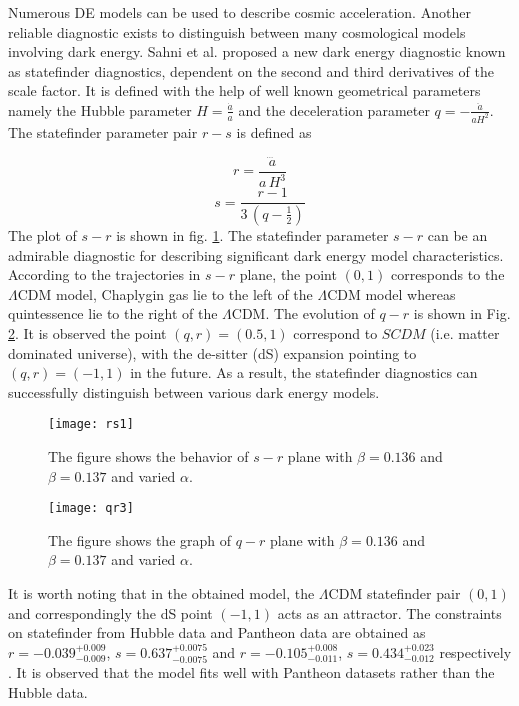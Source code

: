 Numerous DE models can be used to describe cosmic acceleration. Another reliable diagnostic exists to distinguish between many cosmological models involving dark energy. Sahni et al. \cite{Sahni/2003,Alam/2003} proposed a new dark energy diagnostic known as  statefinder diagnostics, dependent on the second and third derivatives of the scale factor. It is defined with the help of well known geometrical parameters namely the Hubble parameter $H=\frac{\dot{a}}{a}$ and the deceleration parameter $q=-\frac{\ddot{a}}{aH^2}$. The statefinder parameter pair ${r-s}$ is defined as

\begin{equation}
\label{36}
r=\frac{\dddot{a}}{a \,H^3}
\end{equation}
\begin{equation}
\label{37}
s=\frac{r-1}{3\,(q-\frac{1}{2})}
\end{equation}
The plot of ${s-r}$ is shown in fig. \ref{fig-7}. The statefinder parameter ${s-r}$ can be an admirable diagnostic  for describing significant dark energy model characteristics. According to the trajectories in ${s-r}$ plane, the point $(0,1)$ corresponds to the $\Lambda$CDM model, Chaplygin gas lie to the left of the $\Lambda$CDM model whereas quintessence lie  to the right of the $\Lambda$CDM. The evolution of ${q-r}$ is shown in Fig. \ref{fig-8}. It is observed the point $(q, r)=(0.5, 1)$ correspond to $SCDM$ (i.e. matter dominated universe), with the de-sitter (dS) expansion pointing to $(q, r) =(-1, 1)$ in the future. As a result, the statefinder diagnostics can successfully distinguish between various dark energy models.

\begin{figure}[H]
\centering
\texttt{[image: rs1]}
\caption{The figure shows the behavior of $s-r$ plane with $\beta=0.136$ and $\beta=0.137$ and varied $\alpha$.}
\label{fig-7}
\end{figure}

\begin{figure}[H]
\centering
\texttt{[image: qr3]}
\caption{The figure shows the graph of $q-r$ plane with $\beta=0.136$ and $\beta=0.137$ and varied $\alpha$.}
\label{fig-8}
\end{figure}
It is worth noting that in the obtained model, the $\Lambda$CDM statefinder pair $(0,1)$ and correspondingly the dS point $(-1,1)$ acts as an attractor. The constraints on statefinder from Hubble data and Pantheon data are obtained as $r= -0.039^{+0.009}_{-0.009}$, $s= 0.637^{+0.0075}_{-0.0075}$ and $r= -0.105^{+0.008}_{-0.011}$, $s= 0.434^{+0.023}_{-0.012}$ respectively \cite{Kumar/2012,Rani/2015}. It is observed that the model fits well with Pantheon datasets rather than the Hubble data. 


